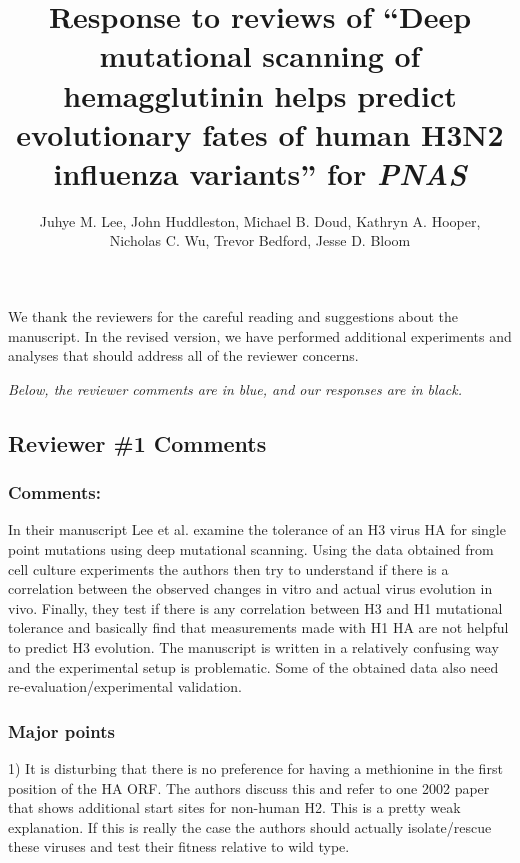 \documentclass[11pt, oneside]{article}   	%
\title{Response to reviews of ``Deep mutational scanning of hemagglutinin helps predict evolutionary fates of human H3N2 influenza variants'' for \textit{PNAS}}
\author{Juhye M. Lee, John Huddleston, Michael B. Doud, Kathryn A. Hooper,\\Nicholas C. Wu, Trevor Bedford, Jesse D. Bloom}
\begin{document}
\maketitle

We thank the reviewers for the careful reading and suggestions about the manuscript.
In the revised version, we have performed additional experiments and analyses that should address all of the reviewer concerns.

\emph{Below, the reviewer comments {\color{blue} are in blue}, and our responses are in black.}

\color{blue}

\subsection*{Reviewer \#1 Comments}

\subsubsection*{Comments:} 
In their manuscript Lee et al. examine the tolerance of an H3 virus HA for single point mutations using deep mutational scanning. Using the data obtained from cell culture experiments the authors then try to understand if there is a correlation between the observed changes in vitro and actual virus evolution in vivo. Finally, they test if there is any correlation between H3 and H1 mutational tolerance and basically find that measurements made with H1 HA are not helpful to predict H3 evolution. The manuscript is written in a relatively confusing way and the experimental setup is problematic. Some of the obtained data also need re-evaluation/experimental validation. 

\subsubsection*{Major points} 

1) It is disturbing that there is no preference for having a methionine in the first position of the HA ORF. The authors discuss this and refer to one 2002 paper that shows additional start sites for non-human H2. This is a pretty weak explanation. If this is really the case the authors should actually isolate/rescue these viruses and test their fitness relative to wild type. 
\end{document}
